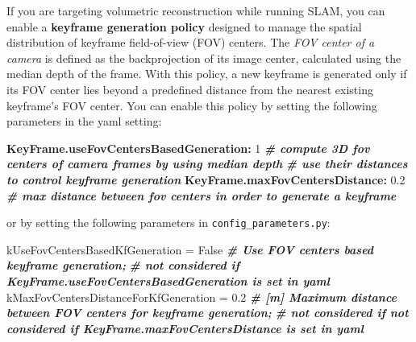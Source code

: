 \documentclass{article}
\newenvironment{Shaded}{\begin{snugshade}}{\end{snugshade}}
\newcommand{\AttributeTok}[1]{\textcolor[rgb]{0.74,0.68,0.62}{#1}}
\newcommand{\CommentTok}[1]{\textcolor[rgb]{0.00,0.40,1.00}{\textbf{\textit{#1}}}}
\newcommand{\DecValTok}[1]{\textcolor[rgb]{0.27,0.67,0.26}{#1}}
\newcommand{\FloatTok}[1]{\textcolor[rgb]{0.27,0.67,0.26}{#1}}
\newcommand{\FunctionTok}[1]{\textcolor[rgb]{1.00,0.58,0.35}{\textbf{#1}}}
\newcommand{\NormalTok}[1]{\textcolor[rgb]{0.74,0.68,0.62}{#1}}
\newcommand{\OperatorTok}[1]{\textcolor[rgb]{0.74,0.68,0.62}{#1}}
\newcommand{\VariableTok}[1]{\textcolor[rgb]{0.74,0.68,0.62}{#1}}
\begin{document}
If you are targeting volumetric reconstruction while running SLAM, you
can enable a \textbf{keyframe generation policy} designed to manage the
spatial distribution of keyframe field-of-view (FOV) centers. The
\emph{FOV center of a camera} is defined as the backprojection of its
image center, calculated using the median depth of the frame. With this
policy, a new keyframe is generated only if its FOV center lies beyond a
predefined distance from the nearest existing keyframe's FOV center. You
can enable this policy by setting the following parameters in the yaml
setting:\\

\begin{scriptsize}
\begin{Shaded}
\begin{Highlighting}[]
\FunctionTok{KeyFrame.useFovCentersBasedGeneration:}\AttributeTok{ }\DecValTok{1}\AttributeTok{  }\CommentTok{# compute 3D fov centers of camera frames by using median depth }
\FunctionTok{}\AttributeTok{ }\DecValTok{}\AttributeTok{  }\CommentTok{                                       # use their distances to control keyframe generation}
\FunctionTok{KeyFrame.maxFovCentersDistance:}\AttributeTok{ }\FloatTok{0.2}\AttributeTok{       }\CommentTok{# max distance between fov centers in order to generate a keyframe}
\end{Highlighting}
\end{Shaded}
\end{scriptsize}

or by setting the following parameters in
\texttt{config\_parameters.py}:

\begin{scriptsize}
\begin{Shaded}
\begin{Highlighting}[]
\NormalTok{kUseFovCentersBasedKfGeneration }\OperatorTok{=} \VariableTok{False}  \CommentTok{# Use FOV centers based keyframe generation;}
\FunctionTok{}\AttributeTok{ }\DecValTok{}\AttributeTok{  }\CommentTok{                                       # not considered if KeyFrame.useFovCentersBasedGeneration is set in yaml}
\NormalTok{kMaxFovCentersDistanceForKfGeneration }\OperatorTok{=} \FloatTok{0.2}  \CommentTok{# [m] Maximum distance between FOV centers for keyframe generation;}
\FunctionTok{}\AttributeTok{ }\DecValTok{}\AttributeTok{  }\CommentTok{                                       # not considered if not considered if KeyFrame.maxFovCentersDistance is set in yaml}
\end{Highlighting}
\end{Shaded}
\end{scriptsize}
\end{document}
